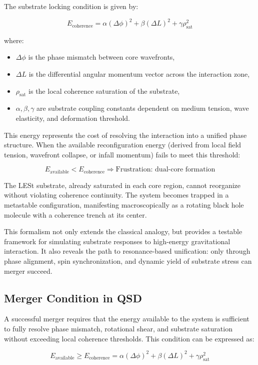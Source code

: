 \documentclass[sn-mathphys]{sn-jnl}
\theoremstyle{thmstyleone}%
\theoremstyle{thmstyletwo}%
\theoremstyle{thmstylethree}%
\begin{document}
The substrate locking condition is given by:

\[
E_{\text{coherence}} = \alpha (\Delta \phi)^2 + \beta (\Delta L)^2 + \gamma \rho_{\text{sat}}^2
\]

where:
\begin{itemize}
\item \( \Delta \phi \) is the phase mismatch between core wavefronts,
\item \( \Delta L \) is the differential angular momentum vector across the interaction zone,
\item \( \rho_{\text{sat}} \) is the local coherence saturation of the substrate,
\item \( \alpha, \beta, \gamma \) are substrate coupling constants dependent on medium tension, wave elasticity, and deformation threshold.
\end{itemize}

This energy represents the cost of resolving the interaction into a unified phase structure. When the available reconfiguration energy (derived from local field tension, wavefront collapse, or infall momentum) fails to meet this threshold:

\[
E_{\text{available}} < E_{\text{coherence}} \Rightarrow \text{Frustration: dual-core formation}
\]

The LESt substrate, already saturated in each core region, cannot reorganize without violating coherence continuity. The system becomes trapped in a metastable configuration, manifesting macroscopically as a rotating black hole molecule with a coherence trench at its center.

This formalism not only extends the classical analogy, but provides a testable framework for simulating substrate responses to high-energy gravitational interaction. It also reveals the path to resonance-based unification: only through phase alignment, spin synchronization, and dynamic yield of substrate stress can merger succeed.
\subsection{Merger Condition in QSD}

A successful merger requires that the energy available to the system is sufficient to fully resolve phase mismatch, rotational shear, and substrate saturation without exceeding local coherence thresholds. This condition can be expressed as:

\[
E_{\text{available}} \geq E_{\text{coherence}} = \alpha (\Delta \phi)^2 + \beta (\Delta L)^2 + \gamma \rho_{\text{sat}}^2
\]
\end{document}

